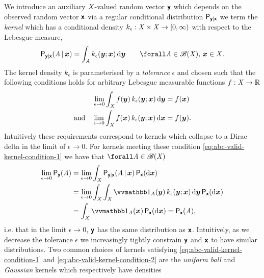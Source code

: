 We introduce an auxiliary $\mathit{X}$-valued random vector $\boldsymbol{\mathsf{y}}$ which depends on the observed random vector $\boldsymbol{\mathsf{x}}$ via a regular conditional distribution $\mathsf{P}_{\boldsymbol{\mathsf{y}}|\boldsymbol{\mathsf{x}}}$ we term the \emph{kernel} which has a conditional density $k_\epsilon : \mathit{X} \times \mathit{X} \to [0, \infty)$ with respect to the Lebesgue measure,
\begin{equation}\label{eq:abc-kernel}
  \prob{\rvct{y}|\rvct{x}}\lpa \set{A} \gvn \vct{x} \rpa = 
  \int_{\set{A}} k_{\epsilon}(\vct{y}; \vct{x}) \,\dr\vct{y}
  \qquad \forall \set{A} \in \borel(\set{X}),\,\vct{x}\in\set{X}.
\end{equation}
The kernel density $k_\epsilon$ is parameterised by a \emph{tolerance} $\epsilon$ and chosen such that the following conditions holds for arbitrary Lebesgue measurable functions $f : \mathit{X} \to \mathbb{R}$
\begin{align}
  \label{eq:abc-valid-kernel-condition-1}
  \lim_{\epsilon \to 0} \int_{\mathit{X}} f(\boldsymbol{y}) \, k_{\epsilon}(\boldsymbol{y}; \boldsymbol{x}) \,\mathrm{d}\boldsymbol{y}
  &= f(\boldsymbol{x})\\
  \label{eq:abc-valid-kernel-condition-2}
  \textrm{and}\quad
  \lim_{\epsilon \to 0} \int_{\mathit{X}} f(\boldsymbol{x}) \, k_{\epsilon}(\boldsymbol{y}; \boldsymbol{x}) \,\mathrm{d}\boldsymbol{x}
  &= f(\boldsymbol{y}).
\end{align}
Intuitively these requirements correspond to kernels which collapse to a Dirac delta in the limit of $\epsilon \to 0$. For kernels meeting these condition \eqref{eq:abc-valid-kernel-condition-1} we have that $\forall \set{A} \in \borel(\set{X})$
\begin{equation}\label{eq:abc-marginal-distribution-convergence}
\begin{split}
  \lim_{\epsilon \to 0 } \prob{\rvct{y}}(\set{A}) &=
  \lim_{\epsilon \to 0} 
  \int_{\set{X}}
    \prob{\rvct{y}|\rvct{x}}\lpa \set{A} \gvn \vct{x} \rpa
  \,\prob{\rvct{x}}(\dr \vct{x})\\
  &=
  \lim_{\epsilon \to 0 } 
  \int_{\set{X}} \int_{\set{X}} 
    \ind{\set{A}}(\vct{y}) \, k_{\epsilon}(\vct{y}; \vct{x}) 
  \,\dr\vct{y} \,\prob{\rvct{x}}(\dr \vct{x})\\
  &=
  \int_{\set{X}} \ind{\set{A}}(\vct{x}) \,\prob{\rvct{x}}(\dr \vct{x}) =
  \prob{\rvct{x}}(\set{A}),
\end{split}
\end{equation}
i.e. that in the limit $\epsilon \to 0$, $\boldsymbol{\mathsf{y}}$ has the same distribution as $\boldsymbol{\mathsf{x}}$. Intuitively, as we decrease the tolerance $\epsilon$ we increasingly tightly constrain $\boldsymbol{\mathsf{y}}$ and $\boldsymbol{\mathsf{x}}$ to have similar distributions. Two common choices of kernels satisfying \eqref{eq:abc-valid-kernel-condition-1} and \eqref{eq:abc-valid-kernel-condition-2} are the \emph{uniform ball} and \emph{Gaussian} kernels which respectively have densities
